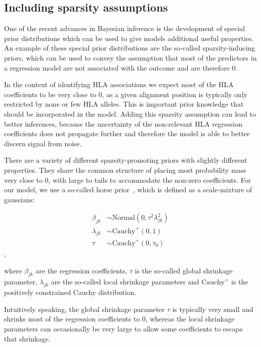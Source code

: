 \documentclass[fleqn,11pt]{SelfArx} %
\begin{document}
\subsection*{Including sparsity assumptions} \label{sec:sparsity}

One of the recent advances in Bayesian inference is the development of special prior distributions which can be used to give models additional useful properties. An example of these special prior distributions are the so-called sparsity-inducing priors, which can be used to convey the assumption that most of the predictors in a regression model are not associated with the outcome and are therefore 0.

In the context of identifying HLA associations we expect most of the HLA coefficients to be very close to 0, as a given alignment position is typically only restricted by none or few HLA alleles.
This is important prior knowledge that should be incorporated in the model.
Adding this sparsity assumption can lead to better inferences, because the uncertainty of the non-relevant HLA regression coefficients does not propagate further and therefore the model is able to better discern signal from noise.

There are a variety of different sparsity-promoting priors with slightly different properties. They share the common structure of placing most probability mass very close to 0, with large to tails to accommodate the non-zero coefficients.
For our model, we use a so-called horse prior~\cite{Carvalho2010}, which is defined as a scale-mixture of gaussians:

\begin{equation}
  \begin{aligned}
    \beta_{jk} &\sim \text{Normal}(0, \tau^{2}\lambda^{2}_{jk}) \\
    \lambda_{jk} &\sim \text{Cauchy}^{+}(0, 1) \\
    \tau &\sim \text{Cauchy}^{+}(0, \tau_{0})
  \end{aligned}
\end{equation},

where \(\beta_{jk}\) are the regression coefficients, \(\tau\) is the so-called global shrinkage parameter, \(\lambda_{jk}\) are the so-called local shrinkage parameters and \(\text{Cauchy}^{+}\) is the positively constrained Cauchy distribution.

Intuitively speaking, the global shrinkage parameter \(\tau\) is typically very small and shrinks most of the regression coefficients to 0, whereas the local shrinkage parameters can occasionally be very large to allow some coefficients to escape that shrinkage.
\end{document}
